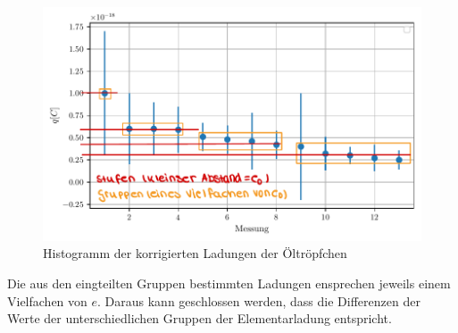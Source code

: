 \begin{figure}[H]
    \centering
    \includegraphics[width=0.5\linewidth]{content/grafik/plot1-korr.pdf}
    \caption{Histogramm der korrigierten Ladungen der Öltröpfchen}
    \label{fig:plotkorr}
\end{figure}

Die aus den eingteilten Gruppen bestimmten Ladungen ensprechen jeweils einem Vielfachen von $e$. Daraus kann geschlossen werden,
dass die Differenzen der Werte der unterschiedlichen Gruppen der Elementarladung entspricht. 
